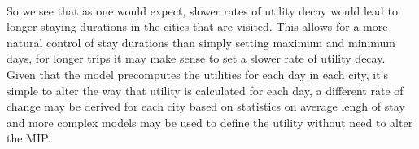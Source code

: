 \documentclass[a4paper]{article}
\begin{document}
\begin{table}[h]
\caption{Trip plan with a decay factor for 0.95 and 0.98 for 15 days}
\centering
{}
\quad
{}
\vspace{1mm}
\end{table}\\
So we see that as one would expect, slower rates of utility decay would lead to longer staying durations in the cities that are visited. This allows for a more natural control of stay durations than simply setting maximum and minimum days, for longer trips it may make sense to set a slower rate of utility decay. Given that the model precomputes the utilities for each day in each city, it's simple to alter the way that utility is calculated for each day, a different rate of change may be derived for each city based on statistics on average lengh of stay and more complex models may be used to define the utility without need to alter the MIP.
\end{document}
